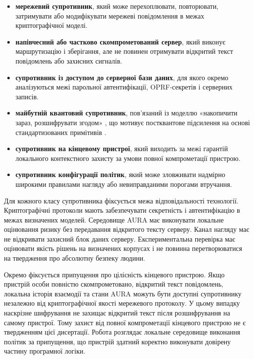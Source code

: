 \begin{itemize}
  \item \textbf{мережевий супротивник}, який може перехоплювати, повторювати, затримувати або модифікувати мережеві повідомлення в межах криптографічної моделі.
  \item \textbf{напівчесний або частково скомпрометований сервер}, який виконує маршрутизацію і зберігання, але не повинен отримувати відкритий текст повідомлень або захисних сигналів.
  \item \textbf{супротивник із доступом до серверної бази даних}, для якого окремо аналізуються межі парольної автентифікації, OPRF-секретів і серверних записів.
  \item \textbf{майбутній квантовий супротивник}, пов'язаний із моделлю «накопичити зараз, розшифрувати згодом» \cite{mosca2018}, що мотивує постквантове підсилення на основі стандартизованих примітивів \cite{fips203}.
  \item \textbf{супротивник на кінцевому пристрої}, який виходить за межі гарантій локального контекстного захисту за умови повної компрометації пристрою.
  \item \textbf{супротивник конфігурації політик}, який може зловживати надмірно широкими правилами нагляду або невиправданими порогами втручання.
\end{itemize}

Для кожного класу супротивника фіксується межа відповідальності технології. Криптографічні протоколи мають забезпечувати секретність і автентифікацію в межах визначених моделей. Середовище AURA має виконувати локальне оцінювання ризику без передавання відкритого тексту серверу. Канал нагляду має не відкривати захисний блок даних серверу. Експериментальна перевірка має оцінювати якість рішень на визначених корпусах і не повинна перетворюватися на твердження про абсолютну безпеку людини.

Окремо фіксується припущення про цілісність кінцевого пристрою. Якщо пристрій особи повністю скомпрометовано, відкритий текст повідомлень, локальна історія взаємодії та стани AURA можуть бути доступні супротивнику незалежно від криптографічної якості мережевого протоколу. У цьому випадку наскрізне шифрування не захищає відкритий текст після розшифрування на самому пристрої. Тому захист від повної компрометації кінцевого пристрою не є твердженням цієї дисертації. Робота розглядає локальне середовище виконання політик за припущення, що пристрій здатний коректно виконувати довірену частину програмної логіки.

